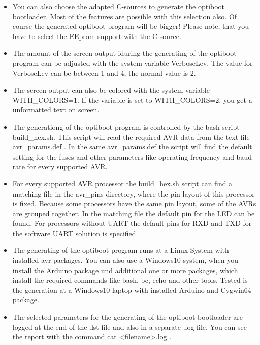 \begin{itemize}

\item {You can also choose the adapted C-sources to generate the optiboot bootloader.
	Most of the features are possible with this selection also.
	Of course the generated optiboot program will be bigger!
	Please note, that you have to select the EEprom support with the C-source.}

\item {The amount of the screen output iduring the generating of the optiboot program
	can be adjusted with the system variable VerboseLev. 
	The value for VerboseLev can be between 1 and 4, the normal value is 2.}

\item {The screen output can also be colored with the system variable WITH\_COLORS=1.
	If the variable is set to WITH\_COLORS=2, you get a unformatted text on screen.}

\item {The generationg of the optiboot program is controlled by the bash script build\_hex.sh.
	This script will read the required AVR data from the text file avr\_params.def .
	In the same avr\_params.def the script will find the default setting for the fuses and
		other parameters like operating frequency and baud rate for every supported AVR.}

\item {For every supported AVR processor the build\_hex.sh script can find a matching
	file in the avr\_pins directory, where the pin layout of this processor is fixed.
	Because some processors have the same pin layout, some of the AVRs are grouped together.
	In the matching file the default pin for the LED can be found.
	For processors without UART the default pins for RXD and TXD for the software UART
	solution is specified.}

\item {The generating of the optiboot program runs at a Linux System with installed avr packages.
	You can also use a Windows10 system, when you install the Arduino package und additional
	one or more packages, which install the required commands like bash, bc, echo and other tools.
	Tested is the generation at a Windows10 laptop with installed Arduino and Cygwin64 package.}

\item {The selected parameters for the generating of the optiboot bootloader are logged at the
	end of the .lst file and also in a separate .log file.
	You can see the report with the command cat <filename>.log .}

\end{itemize}


